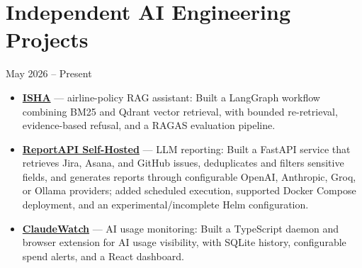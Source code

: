 \section{Independent AI Engineering Projects}
\hfill May 2026 – Present
\begin{itemize}
\item \textbf{\href{https://github.com/utkarshmankad/isha-indigo-rag}{ISHA}} — airline-policy RAG assistant: Built a LangGraph workflow combining BM25 and Qdrant vector retrieval, with bounded re-retrieval, evidence-based refusal, and a RAGAS evaluation pipeline.
\item \textbf{\href{https://github.com/utkarshmankad/reportapi-selfhosted}{ReportAPI Self-Hosted}} — LLM reporting: Built a FastAPI service that retrieves Jira, Asana, and GitHub issues, deduplicates and filters sensitive fields, and generates reports through configurable OpenAI, Anthropic, Groq, or Ollama providers; added scheduled execution, supported Docker Compose deployment, and an experimental/incomplete Helm configuration.
\item \textbf{\href{https://github.com/utkarshmankad/claudewatch}{ClaudeWatch}} — AI usage monitoring: Built a TypeScript daemon and browser extension for AI usage visibility, with SQLite history, configurable spend alerts, and a React dashboard.
\end{itemize}
